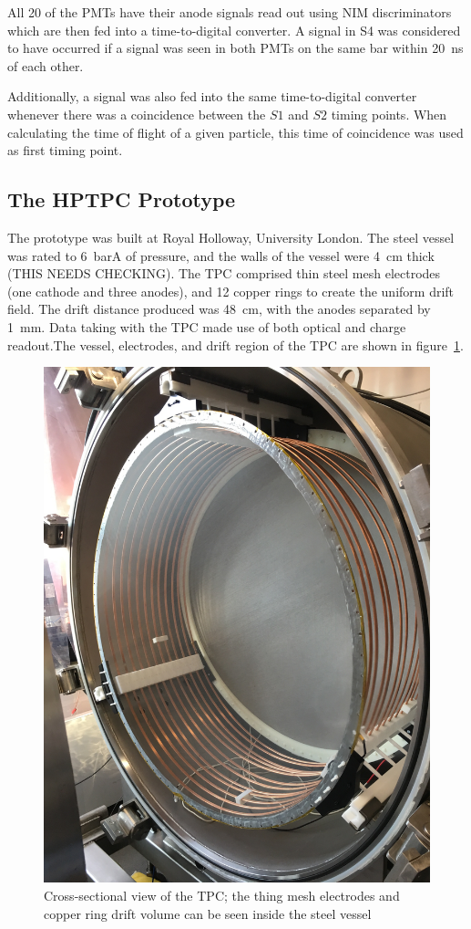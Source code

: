 All 20 of the PMTs have their anode signals read out using NIM discriminators which are then fed into a time-to-digital converter. A signal in S4 was considered to have occurred if a signal was seen in both PMTs on the same bar within 20~ns of each other. 

Additionally, a signal was also fed into the same time-to-digital converter whenever there was a coincidence between the $S1$ and $S2$ timing points. When calculating the time of flight of a given particle, this time of coincidence was used as first timing point.

\subsection{The HPTPC Prototype}
The prototype was built at Royal Holloway, University London.  The steel vessel was rated to 6~barA of pressure, and the walls of the vessel were 4~cm thick (THIS NEEDS CHECKING).
The TPC comprised thin steel mesh electrodes (one cathode and three anodes), and 12 copper rings to create the uniform drift field. The drift distance produced was 48~cm, with the anodes separated by 1~mm. Data taking with the TPC made use of both optical and charge readout.The vessel, electrodes, and drift region of the TPC are shown in figure~\ref{fig:TPC}.
    
     \begin{figure}
      \centering
    \includegraphics[width=0.6\linewidth]{files/Figures/IMG_1194.jpg}
    	\caption{Cross-sectional view of the TPC; the thing mesh electrodes and copper ring drift volume can be seen inside the steel vessel}
    		\label{fig:TPC}
    \end{figure}
    
